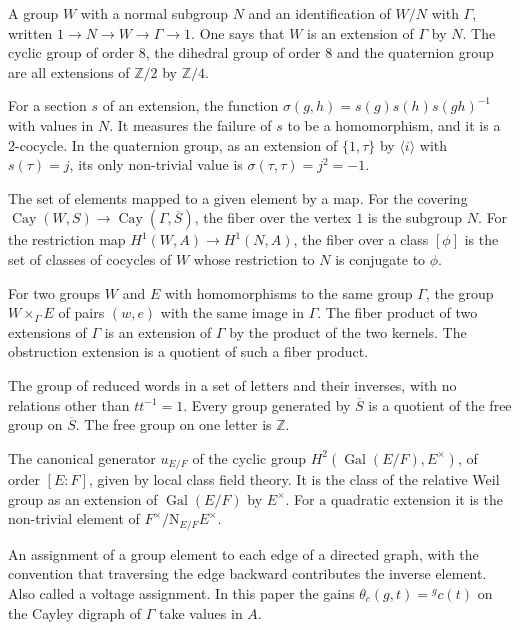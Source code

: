 \documentclass[12pt,letterpaper]{article}
\numberwithin{equation}{section}
\theoremstyle{plain}
\theoremstyle{definition}
\newcommand{\Z}{\mathbb{Z}}
\newcommand{\act}[2]{{}^{#1}\!#2}          %
\DeclareMathOperator{\Gal}{Gal}
\DeclareMathOperator{\Cay}{Cay}
\newcommand{\Nm}{\mathrm{N}_{E/F}}
\begin{document}
\begin{description}[itemsep=3pt,leftmargin=1.5em,style=unboxed]
\item[Extension of groups.] A group $W$ with a normal subgroup $N$ and an
identification of $W/N$ with $\Gamma$, written $1\to N\to W\to\Gamma\to1$.
One says that $W$ is an extension of $\Gamma$ by $N$. The cyclic group of
order $8$, the dihedral group of order $8$ and the quaternion group are
all extensions of $\Z/2$ by $\Z/4$.

\item[Factor set.] For a section $s$ of an extension, the function
$\sigma(g,h)=s(g)s(h)s(gh)^{-1}$ with values in $N$. It measures the
failure of $s$ to be a homomorphism, and it is a $2$-cocycle. In the
quaternion group, as an extension of $\{1,\tau\}$ by $\langle i\rangle$
with $s(\tau)=j$, its only non-trivial value is
$\sigma(\tau,\tau)=j^2=-1$.

\item[Fiber.] The set of elements mapped to a given element by a map. For
the covering $\Cay(W,S)\to\Cay(\Gamma,\overline{S})$, the fiber over the
vertex $1$ is the subgroup $N$. For the restriction map
$H^1(W,A)\to H^1(N,A)$, the fiber over a class $[\phi]$ is the set of
classes of cocycles of $W$ whose restriction to $N$ is conjugate to
$\phi$.

\item[Fiber product.] For two groups $W$ and $E$ with homomorphisms to
the same group $\Gamma$, the group $W\times_\Gamma E$ of pairs $(w,e)$
with the same image in $\Gamma$. The fiber product of two extensions of
$\Gamma$ is an extension of $\Gamma$ by the product of the two kernels.
The obstruction extension is a quotient of such a fiber product.

\item[Free group.] The group of reduced words in a set of letters and
their inverses, with no relations other than $tt^{-1}=1$. Every group
generated by $\overline{S}$ is a quotient of the free group on
$\overline{S}$. The free group on one letter is $\Z$.

\item[Fundamental class.] The canonical generator $u_{E/F}$ of the cyclic
group $H^2(\Gal(E/F),E^\times)$, of order $[E:F]$, given by local class
field theory. It is the class of the relative Weil group as an extension
of $\Gal(E/F)$ by $E^\times$. For a quadratic extension it is the
non-trivial element of $F^\times/\Nm E^\times$.

\item[Gain function.] An assignment of a group element to each edge of a
directed graph, with the convention that traversing the edge backward
contributes the inverse element. Also called a voltage assignment. In
this paper the gains $\theta_c(g,t)=\act{g}{c(t)}$ on the Cayley digraph of
$\Gamma$ take values in $A$.


\end{description}
\end{document}
